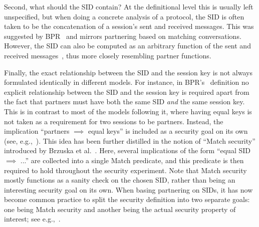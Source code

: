 Second,
what should the SID contain?
At the definitional level this is usually left unspecified,
but when doing a concrete analysis of a protocol,
the SID is often taken to be the concatenation of a session's sent and received messages.
This was suggested by BPR~\cite{EC:BelPoiRog00} and mirrors partnering based on matching conversations.
However,
the SID can also be computed as an arbitrary function of the sent and received messages~\cite{PKC:AbdFouPoi05},
thus more closely resembling partner functions.

Finally,
the exact relationship between the SID and the session key is not always formulated identically in different models.
For instance,
in BPR's~\cite{EC:BelPoiRog00} definition no explicit relationship between the SID and the session key is required apart from the fact that partners must have both the same SID \emph{and} the same session key.
This is in contrast to most  of the models following it,
where having equal keys is not taken as a requirement for two sessions to be partners.
Instead,
the implication ``partners $\implies$ equal keys'' is included as a security goal on its own 
(see, e.g.,~\cite{EC:CanKra01,C:CanKra02,PROVSEC:LaMLauMit07,ESORICS:CreFel12}).
This idea has been further distilled in the notion of ``\textsf{Match} security'' introduced by Brzuska et al.~\cite{CCS:BFWW11}.
Here, several implications of the form ``equal SID $\implies$ ...'' are collected into a single \textsf{Match} predicate,
and this predicate is then required to hold throughout the security experiment.
Note that \textsf{Match} security mostly functions as a sanity check on the chosen SID,
rather than being an interesting security goal on its own.
When basing partnering on SIDs,
it has now become common practice to split the security definition into two separate goals:
one being \textsf{Match} security and another being the  actual security property of interest; see e.g.,~\cite{CCS:BFWW11,BrzuskaFSWW:2012:less_is_more,CCS:FisGue14,CCS:DFGS15}. 



